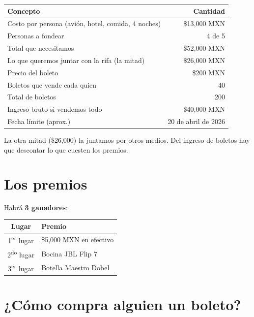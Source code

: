\documentclass[12pt,a4paper]{article}
\begin{document}
\begin{table}[H]
\centering
\begin{tabularx}{\textwidth}{Xr}
\toprule
\textbf{Concepto} & \textbf{Cantidad} \\
\midrule
Costo por persona (avión, hotel, comida, 4 noches) & \$13,000 MXN \\
Personas a fondear & 4 de 5 \\
Total que necesitamos & \$52,000 MXN \\
Lo que queremos juntar con la rifa (la mitad) & \$26,000 MXN \\
Precio del boleto & \$200 MXN \\
Boletos que vende cada quien & 40 \\
Total de boletos & 200 \\
Ingreso bruto si vendemos todo & \$40,000 MXN \\
Fecha límite (aprox.) & 20 de abril de 2026 \\
\bottomrule
\end{tabularx}
\end{table}

La otra mitad (\$26,000) la juntamos por otros medios. Del ingreso de boletos hay que descontar lo que cuesten los premios.

\section{Los premios}

Habrá \textbf{3 ganadores}:

\begin{table}[H]
\centering
\begin{tabularx}{0.7\textwidth}{cX}
\toprule
\textbf{Lugar} & \textbf{Premio} \\
\midrule
1\textsuperscript{er} lugar & \$5,000 MXN en efectivo \\
2\textsuperscript{do} lugar & Bocina JBL Flip 7 \\
3\textsuperscript{er} lugar & Botella Maestro Dobel \\
\bottomrule
\end{tabularx}
\end{table}

\section{¿Cómo compra alguien un boleto?}
\end{document}
